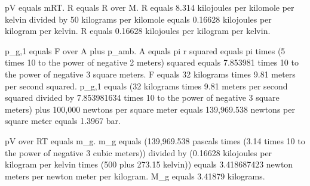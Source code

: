 pV equals mRT.  
R equals R over M.  
R equals 8.314 kilojoules per kilomole per kelvin divided by 50 kilograms per kilomole equals 0.16628 kilojoules per kilogram per kelvin.  
R equals 0.16628 kilojoules per kilogram per kelvin.  

p_g,1 equals F over A plus p_amb.  
A equals pi r squared equals pi times (5 times 10 to the power of negative 2 meters) squared equals 7.853981 times 10 to the power of negative 3 square meters.  
F equals 32 kilograms times 9.81 meters per second squared.  
p_g,1 equals (32 kilograms times 9.81 meters per second squared divided by 7.853981634 times 10 to the power of negative 3 square meters) plus 100,000 newtons per square meter equals 139,969.538 newtons per square meter equals 1.3967 bar.  

pV over RT equals m_g.  
m_g equals (139,969.538 pascals times (3.14 times 10 to the power of negative 3 cubic meters)) divided by (0.16628 kilojoules per kilogram per kelvin times (500 plus 273.15 kelvin)) equals 3.418687423 newton meters per newton meter per kilogram.  
M_g equals 3.41879 kilograms.